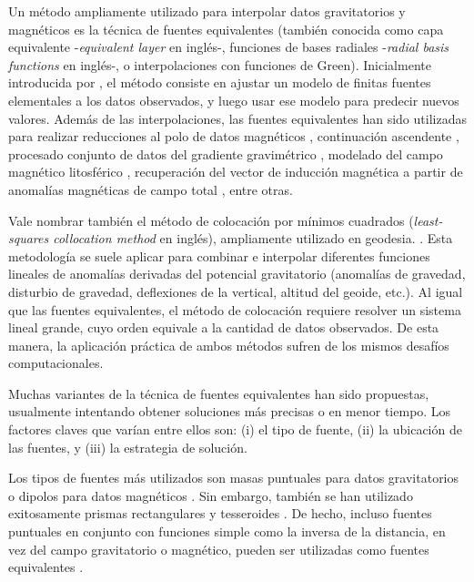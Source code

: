 Un método ampliamente utilizado para interpolar datos gravitatorios
y magnéticos es la técnica de fuentes equivalentes (también conocida como capa
equivalente -\emph{equivalent layer} en inglés-, funciones de bases radiales
-\emph{radial basis functions} en inglés-, o interpolaciones con funciones de
Green).
Inicialmente introducida por \citet{dampney1969}, el método consiste en ajustar
un modelo de finitas fuentes elementales a los datos observados, y luego usar
ese modelo para predecir nuevos valores.
Además de las interpolaciones, las fuentes equivalentes han sido utilizadas
para realizar reducciones al polo de datos magnéticos \citep{silva1986,
nakatsuka2006, guspi2009}, continuación ascendente \citep{emilia1973, li2010},
procesado conjunto de datos del gradiente gravimétrico \citet{barnes2011},
modelado del campo magnético litosférico \citep{kother2015}, recuperación del
vector de inducción magnética a partir de anomalías magnéticas de campo total
\citep{li2020}, entre otras.

Vale nombrar también el método de colocación por mínimos cuadrados
(\emph{least-squares collocation method} en inglés), ampliamente utilizado en
geodesia.
\citep[][y referencias allí citadas]{tscherning2015}.
Esta metodología se suele aplicar para combinar e interpolar diferentes
funciones lineales de anomalías derivadas del potencial gravitatorio (anomalías
de gravedad, disturbio de gravedad, deflexiones de la vertical, altitud del
geoide, etc.).
Al igual que las fuentes equivalentes, el método de colocación requiere
resolver un sistema lineal grande, cuyo orden equivale a la cantidad de datos
observados.
De esta manera, la aplicación práctica de ambos métodos sufren de los mismos
desafíos computacionales.

Muchas variantes de la técnica de fuentes equivalentes han sido propuestas,
usualmente intentando obtener soluciones más precisas o en menor tiempo.
Los factores claves que varían entre ellos son: (i) el tipo de fuente, (ii) la
ubicación de las fuentes, y (iii) la estrategia de solución.

Los tipos de fuentes más utilizados son masas puntuales para datos
gravitatorios o dipolos para datos magnéticos \citep[e.g.,~][]{vonfrese1981,
silva1986, mendonca1994, siqueira2017}.
Sin embargo, también se han utilizado exitosamente prismas rectangulares
\citep[por~ej.,][]{barnes2011, jirigalatu2019, li2020} y tesseroides
\citep{bouman2016}.
De hecho, incluso fuentes puntuales en conjunto con funciones simple como la
inversa de la distancia, en vez del campo gravitatorio o magnético, pueden ser
utilizadas como fuentes equivalentes \citep{cordell1992}.

